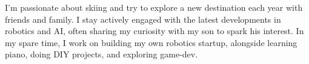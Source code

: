 

\begin{cvparagraph}

I’m passionate about skiing and try to explore a new destination each year with friends and family. 
I stay actively engaged with the latest developments in robotics and AI, often sharing my curiosity with my son to spark his interest. 
In my spare time, I work on building my own robotics startup, alongside learning piano, doing DIY projects, and exploring game-dev.

\end{cvparagraph}
